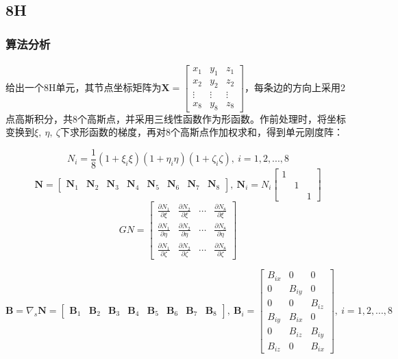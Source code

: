 \documentclass[UTF8]{ctexbook}
\begin{document}
\subsection{8H}

\subsubsection {算法分析}
\paragraph{}

给出一个8H单元，其节点坐标矩阵为$\boldsymbol{X}=\begin{bmatrix}x_{1} & y_{1} & z_{1}\\
x_{2} & y_{2} & z_{2}\\
\vdots & \vdots & \vdots\\
x_{8} & y_{8} & z_{8}
\end{bmatrix}$，每条边的方向上采用2点高斯积分，共8个高斯点，并采用三线性函数作为形函数。作前处理时，将坐标变换到$\xi,\ \eta,\ \zeta$下求形函数的梯度，再对8个高斯点作加权求和，得到单元刚度阵：


\[
N_{i}=\frac{1}{8}(1+\xi_{i}\xi)(1+\eta_{i}\eta)(1+\zeta_{i}\zeta),\ i=1,2,...,8
\]
\[
\boldsymbol{N}=\begin{bmatrix}\boldsymbol{N}_{1} & \boldsymbol{N}_{2} & \boldsymbol{N}_{3} & \boldsymbol{N}_{4} & \boldsymbol{N}_{5} & \boldsymbol{N}_{6} & \boldsymbol{N}_{7} & \boldsymbol{N}_{8}\end{bmatrix},\ \boldsymbol{N}_{i}=N_{i}\begin{bmatrix}1\\
 & 1\\
 &  & 1
\end{bmatrix}
\]
\[
GN=\begin{bmatrix}\frac{\partial N_{1}}{\partial\xi} & \frac{\partial N_{2}}{\partial\xi} & \cdots & \frac{\partial N_{8}}{\partial\xi}\\
\frac{\partial N_{1}}{\partial\eta} & \frac{\partial N_{2}}{\partial\eta} & \cdots & \frac{\partial N_{8}}{\partial\eta}\\
\frac{\partial N_{1}}{\partial\zeta} & \frac{\partial N_{2}}{\partial\zeta} & \cdots & \frac{\partial N_{8}}{\partial\zeta}
\end{bmatrix}
\]



\[
\boldsymbol{B}=\nabla_{s}\boldsymbol{N}=\begin{bmatrix}\boldsymbol{B}_{1} & \boldsymbol{B}_{2} & \boldsymbol{B}_{3} & \boldsymbol{B}_{4} & \boldsymbol{B}_{5} & \boldsymbol{B}_{6} & \boldsymbol{B}_{7} & \boldsymbol{B}_{8}\end{bmatrix},\ \boldsymbol{B}_{i}=\begin{bmatrix}B_{ix} & 0 & 0\\
0 & B_{iy} & 0\\
0 & 0 & B_{iz}\\
B_{iy} & B_{ix} & 0\\
0 & B_{iz} & B_{iy}\\
B_{iz} & 0 & B_{ix}
\end{bmatrix},\ i=1,2,...,8
\]
\end{document}

